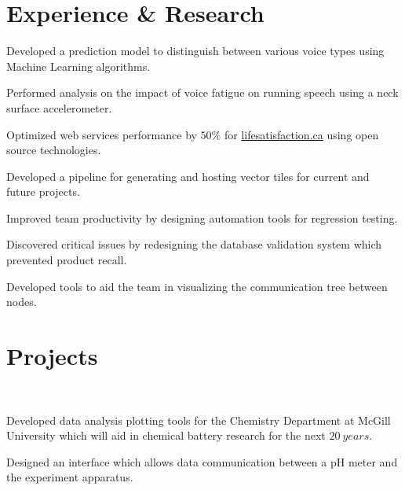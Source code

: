 \documentclass[]{sumbal-resume}
\begin{document}
\begin{minipage}[t]{0.66\textwidth}
\section{Experience \& Research}

\vspace{\topsep}
\begin{tightemize}
\item Developed a prediction model to distinguish between various voice types using Machine Learning algorithms. 
\item Performed analysis on the impact of voice fatigue on running speech using a neck surface accelerometer.
\end{tightemize}

\begin{tightemize}
\item Optimized web services performance by $50 \%$ for \href{http://lifesatisfaction.ca}{lifesatisfaction.ca} using open source technologies.
\item Developed a pipeline for generating and hosting vector tiles for current and future projects.
\end{tightemize}

\begin{tightemize}
\item Improved team productivity by designing automation tools for regression testing. 
\item Discovered critical issues by redesigning the database validation system which prevented product recall.
\item Developed tools to aid the team in visualizing the communication tree between nodes.
\end{tightemize}

\sectionsep
\section{Projects}

 \\
\begin{tightemize}
\item Developed data analysis plotting tools for the Chemistry Department at McGill University which will aid in chemical battery research for the next $20 \ years$. 
\item Designed an interface which allows data communication between a pH meter and the experiment apparatus. 
\end{tightemize}


\end{minipage}
\end{document}
